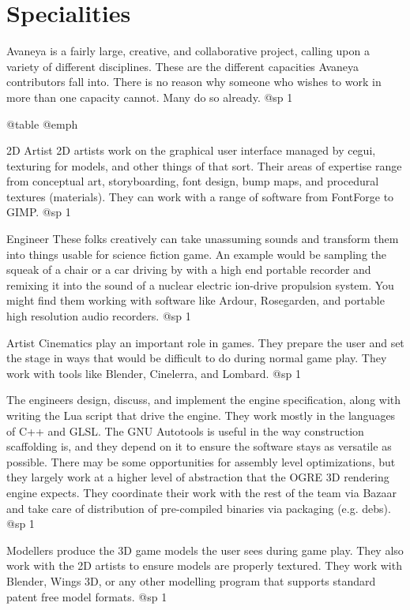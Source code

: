 \section{Specialities}
Avaneya is a fairly large, creative, and collaborative project, calling upon a variety of different disciplines. These are the different capacities Avaneya contributors fall into. There is no reason why someone who wishes to work in more than one capacity cannot. Many do so already.
@sp 1

@table @emph
\item2D Artist
2D artists work on the graphical user interface managed by cegui, texturing for models, and other things of that sort. Their areas of expertise range from conceptual art, storyboarding, font design, bump maps, and procedural textures (materials). They can work with a range of software from FontForge to GIMP.
@sp 1

\itemAudio Engineer
These folks creatively can take unassuming sounds and transform them into things usable for science fiction game. An example would be sampling the squeak of a chair or a car driving by with a high end portable recorder and remixing it into the sound of a nuclear electric ion-drive propulsion system. You might find them working with software like Ardour, Rosegarden, and portable high resolution audio recorders.
@sp 1

\itemCinematic Artist
Cinematics play an important role in games. They prepare the user and set the stage in ways that would be difficult to do during normal game play. They work with tools like Blender, Cinelerra, and Lombard.
@sp 1

\itemEngineer
The engineers design, discuss, and implement the engine specification, along with writing the Lua script that drive the engine. They work mostly in the languages of C++ and GLSL. The GNU Autotools is useful in the way construction scaffolding is, and they depend on it to ensure the software stays as versatile as possible. There may be some opportunities for assembly level optimizations, but they largely work at a higher level of abstraction that the OGRE 3D rendering engine expects. They coordinate their work with the rest of the team via Bazaar and take care of distribution of pre-compiled binaries via packaging (e.g. debs).
@sp 1

\itemModeller
Modellers produce the 3D game models the user sees during game play. They also work with the 2D artists to ensure models are properly textured. They work with Blender, Wings 3D, or any other modelling program that supports standard patent free model formats.
@sp 1

